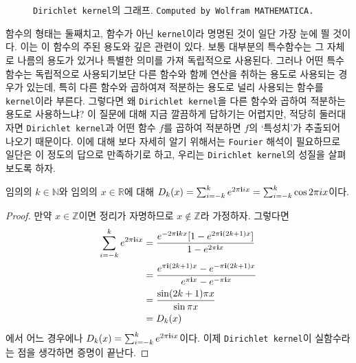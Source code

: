 \begin{figure}[!ht]
    \caption{\texttt{Dirichlet kernel}의 그래프. \texttt{Computed by Wolfram MATHEMATICA.}}
\end{figure}

함수의 형태는 둘째치고, 함수가 아닌 \texttt{kernel}이라 명명된 것이 일단 가장 눈에 띌 것이다. 이는 이 함수의 주된 용도와 깊은 관련이 있다. 보통 대부분의 특수함수는 그 자체로 나름의 용도가 있거나 특별한 의미를 가져 독립적으로 사용된다. 그러나 어떤 특수함수는 독립적으로 사용되기보단 다른 함수와 함께 연산을 취하는 용도로 사용되는 경우가 있는데, 특히 다른 함수와 곱하여져 적분하는 용도로 널리 사용되는 함수를 \texttt{kernel}이라 부른다. 그렇다면 왜 \texttt{Dirichlet kernel}을 다른 함수와 곱하여 적분하는 용도로 사용하느냐? 이 질문에 대해 지금 깔끔하게 답하기는 어렵지만, 적당히 둘러대자면 \texttt{Dirichlet kernel}과 어떤 함수 $f$를 곱하여 적분하면 $f$의 `특성치'가 추출되어 나오기 때문이다. 이에 대해 보다 자세히 알기 위해서는 \texttt{Fourier} 해석이 필요하므로 일단은 이 정도의 답으로 만족하기로 하고, 우리는 \texttt{Dirichlet kernel}의 성질을 살펴보도록 하자.

\begin{theorem}\label{thm:dirichletKernelExpansion}
    임의의 $k\in\mathbb{N}$와 임의의 $x\in\mathbb{R}$에 대해 $D_k(x)=\sum_{i=-k}^ke^{2\pi\mathbf{i} ix}=\sum_{i=-k}^k\cos 2\pi ix$이다.
\end{theorem}

\begin{proof}
    만약 $x\in\mathbb{Z}$이면 정리가 자명하므로 $x\notin\mathbb{Z}$라 가정하자. 그렇다면
    \begin{align*}
        \sum_{i=-k}^ke^{2\pi\mathbf{i} ix}&=\frac{e^{-2\pi\mathbf{i} kx}[1-e^{2\pi\mathbf{i}(2k+1)x}]}{1-e^{2\pi\mathbf{i} x}}\\
        &=\frac{e^{\pi\mathbf{i}(2k+1)x}-e^{-\pi\mathbf{i}(2k+1)x}}{e^{\pi\mathbf{i} x}-e^{-\pi\mathbf{i} x}}\\
        &=\frac{\sin(2k+1)\pi x}{\sin\pi x}\\
        &=D_k(x)
    \end{align*}
    에서 어느 경우에나 $D_k(x)=\sum_{i=-k}^ke^{2\pi\mathbf{i} ix}$이다. 이제 \texttt{Dirichlet kernel}이 실함수라는 점을 생각하면 증명이 끝난다.
\end{proof}

